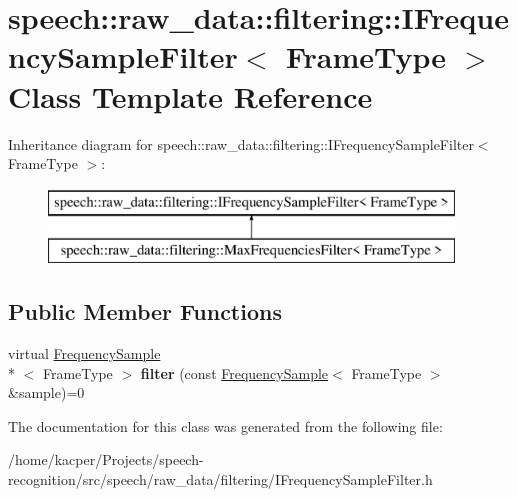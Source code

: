 \hypertarget{classspeech_1_1raw__data_1_1filtering_1_1IFrequencySampleFilter}{\section{speech\+:\+:raw\+\_\+data\+:\+:filtering\+:\+:I\+Frequency\+Sample\+Filter$<$ Frame\+Type $>$ Class Template Reference}
\label{classspeech_1_1raw__data_1_1filtering_1_1IFrequencySampleFilter}
}
Inheritance diagram for speech\+:\+:raw\+\_\+data\+:\+:filtering\+:\+:I\+Frequency\+Sample\+Filter$<$ Frame\+Type $>$\+:\begin{figure}[H]
\begin{center}
\leavevmode
\includegraphics[height=2.000000cm]{classspeech_1_1raw__data_1_1filtering_1_1IFrequencySampleFilter}
\end{center}
\end{figure}
\subsection*{Public Member Functions}
\begin{DoxyCompactItemize}
\item 
\hypertarget{classspeech_1_1raw__data_1_1filtering_1_1IFrequencySampleFilter_a8a6ed0312a73a747f9188dff906ecfd7}{virtual \hyperlink{classspeech_1_1raw__data_1_1FrequencySample}{Frequency\+Sample}\\*
$<$ Frame\+Type $>$ {\bfseries filter} (const \hyperlink{classspeech_1_1raw__data_1_1FrequencySample}{Frequency\+Sample}$<$ Frame\+Type $>$ \&sample)=0}\label{classspeech_1_1raw__data_1_1filtering_1_1IFrequencySampleFilter_a8a6ed0312a73a747f9188dff906ecfd7}

\end{DoxyCompactItemize}


The documentation for this class was generated from the following file\+:\begin{DoxyCompactItemize}
\item 
/home/kacper/\+Projects/speech-\/recognition/src/speech/raw\+\_\+data/filtering/I\+Frequency\+Sample\+Filter.\+h\end{DoxyCompactItemize}
